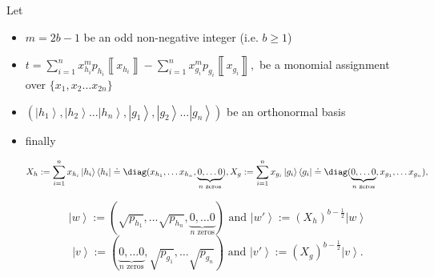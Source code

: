 \documentclass{article}
\begin{document}
\begin{proposition}
  \label{prop:ExactSolnBalancedMonomialMisaligned}Let
  \begin{itemize}
    \item $m=2b-1$ be an odd non-negative integer (i.e. $b\ge1$)
    \item $
            t=\sum_{i=1}^{n}x_{h_{i}}^{m}p_{h_{i}}\left\llbracket x_{h_{i}}\right\rrbracket -\sum_{i=1}^{n}x_{g_{i}}^{m}p_{g_{i}}\left\llbracket x_{g_{i}}\right\rrbracket ,
          $ be a monomial assignment over $\{x_{1},x_{2}\dots x_{2n}\}$
    \item $\left(\left|h_{1}\right\rangle ,\left|h_{2}\right\rangle \dots\left|h_{n}\right\rangle ,\left|g_{1}\right\rangle ,\left|g_{2}\right\rangle \dots\left|g_{n}\right\rangle \right)$
          be an orthonormal basis
    \item finally
          \begin{footnotesize}
            \begin{displaymath}
              X_{h}:=\sum_{i=1}^{n}x_{h_{i}}\left|h_{i}\right\rangle \left\langle h_{i}\right|\doteq\diag(x_{h_{1}},\dots x_{h_{n}},\underbrace{0,\dots0}_{n\text{ zeros}}),
              X_{g}:=\sum_{i=1}^{n}x_{g_{i}}\left|g_{i}\right\rangle \left\langle g_{i}\right|\doteq\diag(\underbrace{0,\dots0}_{n\text{ zeros}},x_{g_{1}},\dots x_{g_{n}}),
            \end{displaymath}
          \end{footnotesize}

          \begin{displaymath}
            \left|w\right\rangle :=(\sqrt{p_{h_{1}}},\dots\sqrt{p_{h_{n}}},\underbrace{0,\dots0}_{n\text{ zeros}}) \text{ and } \left|w'\right\rangle :=(X_{h})^{b-\frac{1}{2}}\left|w\right\rangle
          \end{displaymath}
          \begin{displaymath}
            \left|v\right\rangle :=(\underbrace{0,\dots0}_{n\text{ zeros}},\sqrt{p_{g_{1}}},\dots\sqrt{p_{g_{n}}}) \text{ and }\left|v'\right\rangle :=(X_{g})^{b-\frac{1}{2}}\left|v\right\rangle.
          \end{displaymath}


\end{itemize}
\end{proposition}
\end{document}
